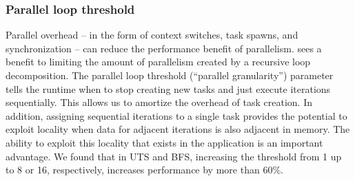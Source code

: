 {%





\subsubsection{Parallel loop threshold}


Parallel overhead -- in the form of context switches, task spawns, and
synchronization -- can reduce the performance benefit of parallelism.
\Grappa sees a benefit to limiting the amount of parallelism created by
a recursive loop decomposition. The parallel loop threshold (``parallel
granularity'') parameter tells the runtime when to stop creating new tasks and just execute iterations
sequentially. This allows us to amortize the overhead of task
creation. In addition, assigning sequential iterations to a single
task provides the potential to exploit locality when data for adjacent iterations is
also adjacent in memory. The ability to exploit this locality that
exists in the application is an important advantage. We found that in UTS and BFS, increasing the
threshold from 1 up to 8 or 16, respectively, increases performance by
more than 60\%.



}
